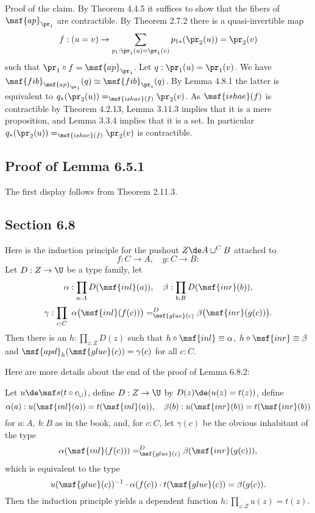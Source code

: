 \documentclass[12pt]{article}
\begin{document}
\nn Proof of the claim. By Theorem 4.4.5 it suffices to show that the fibers of $\msf{ap}_{\pr_1}$ are contractible. By Theorem 2.7.2 there is a quasi-invertible map 
$$
f:(u=v)\to\sum_{p_1:\pr_1(u)=\pr_1(v)}p_{1*}(\pr_2(u))=\pr_2(v)
$$ 
such that $\pr_1\circ f=\msf{ap}_{\pr_1}$. Let $q:\pr_1(u)=\pr_1(v)$. We have $\msf{fib}_{\msf{ap}_{\pr_1}}(q)\simeq\msf{fib}_{\pr_1}(q)$. By Lemma 4.8.1 the latter is equivalent to $q_*(\pr_2(u))=_{\msf{ishae}(f)}\pr_2(v)$. As $\msf{ishae}(f)$ is contractible by Theorem 4.2.13, Lemma 3.11.3 implies that it is a mere proposition, and Lemma 3.3.4 implies that it is a set. In particular $q_*(\pr_2(u))=_{\msf{ishae}(f)}\pr_2(v)$ is contractible.


\subsection{Proof of Lemma 6.5.1}

The first display follows from Theorem 2.11.3.


\subsection{Section 6.8}

Here is the induction principle for the pushout $Z\de A\sqcup^CB$ attached to 
$$
f:C\to A,\quad g:C\to B:
$$ 
Let $D:Z\to\U$ be a type family, let 
$$
\alpha:\prod_{a:A}D(\msf{inl}(a)),\quad\beta:\prod_{b:B}D(\msf{inr}(b)),
$$
$$
\gamma:\prod_{c:C}\ \alpha\big(\msf{inl}(f(c))\big)=^D_{\msf{glue}(c)}\beta\big(\msf{inr}(g(c))\big).
$$ 
Then there is an $h:\prod_{z:Z}D(z)$ such that $h\circ \msf{inl}\equiv\alpha$, $h\circ \msf{inr}\equiv\beta$ and $\msf{apd}_h(\msf{glue}(c))=\gamma(c)$ for all $c:C$. 

Here are more details about the end of the proof of Lemma 6.8.2:

Let $u\de\msf s(t\circ c_\sqcup)$, define $D:Z\to\U$ by $D(z)\de(u(z)=t(z))$, define 
$$
\alpha(a):u(\msf{inl}(a))=t(\msf{inl}(a)),\quad\beta(b):u(\msf{inr}(b))=t(\msf{inr}(b))
$$ 
for $a:A,\ b:B$ as in the book, and, for $c:C$, let $\gamma(c)$ be the obvious inhabitant of the type
$$
\alpha(\msf{inl}(f(c)))=^D_{\msf{glue}(c)}\beta(\msf{inr}(g(c))),
$$ 
which is equivalent to the type 
$$ 
u(\msf{glue}(c))^{-1}\cdot\alpha(f(c))\cdot t(\msf{glue}(c))=\beta(g(c)).
$$ 
Then the induction principle yields a dependent function $h:\prod_{z:Z}u(z)=t(z)$.
\end{document}
